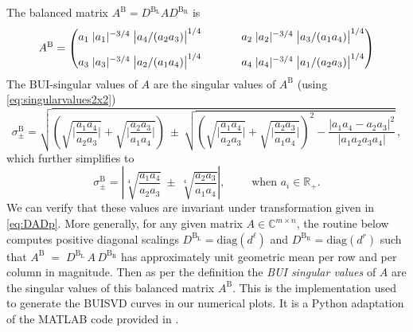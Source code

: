 \documentclass[11pt,a4paper]{article}
\newcommand{\be}{\begin{equation}}
\newcommand{\ee}{\end{equation}}
\begin{document}
The balanced matrix $A^\mathrm{B}=D^{\mathrm{B_L}} A D^{\mathrm{B_R}}$ is
\begin{equation}
\begingroup
\setlength{\arraycolsep}{1.8em}
A^{\mathrm B}=
\begin{pmatrix}
a_1\;|a_1|^{-3/4}\;\bigl|a_4/(a_2 a_3)\bigr|^{1/4}
&
a_2\;|a_2|^{-3/4}\;\bigl|a_3/(a_1 a_4)\bigr|^{1/4}
\\[8pt]
a_3\;|a_3|^{-3/4}\;\bigl|a_2/(a_1 a_4)\bigr|^{1/4}
&
a_4\;|a_4|^{-3/4}\;\bigl|a_1/(a_2 a_3)\bigr|^{1/4}
\end{pmatrix}
\endgroup
\end{equation}
The BUI-singular values of $A$ are the singular values of $A^\mathrm{B}$ (using \cref{eq:singularvalues2x2})
\begin{equation}\label{eq:ui-2x2-balanced-sv}
\sigma^{\mathrm B}_{\pm}
=
\sqrt{
\left(
\sqrt{\bigg|\frac{a_1 a_4}{a_2 a_3}\bigg|}
+
\sqrt{\bigg|\frac{a_2 a_3}{a_1 a_4}\bigg|}
\right)
\ \pm\
\sqrt{
\left(
\sqrt{\bigg|\frac{a_1 a_4}{a_2 a_3}\bigg|}
+
\sqrt{\bigg|\frac{a_2 a_3}{a_1 a_4}\bigg|}
\right)^{\!2}
-
\frac{\big|a_1 a_4 - a_2 a_3\big|^{2}}{\big|a_1 a_2 a_3 a_4\big|}
}
}\,,
\end{equation}
which further simplifies to
\be
\sigma^{\mathrm B}_{\pm}
=
\left|
\sqrt[4]{\frac{a_1 a_4}{a_2 a_3}}
\ \pm\
\sqrt[4]{\frac{a_2 a_3}{a_1 a_4}}
\right|,
\qquad \text{ when } a_i\in\mathbb{R}_{+}.
\ee
We can verify that these values are invariant under transformation given in \cref{eq:DADp}. More generally, for any given matrix $A\in\mathbb{C}^{m\times n}$, the routine below computes positive diagonal scalings $D^{\mathrm{B_L}}=\mathrm{diag}(d^\ell)$ and $D^{\mathrm{B_R}}=\mathrm{diag}(d^r)$ such that \(A^{\mathrm B} \;=\; D^{\mathrm {B_L}}\,A\,D^{\mathrm {B_R}}\) has approximately unit geometric mean per row and per column in magnitude. Then as per the definition the \emph{BUI singular values} of $A$ are the singular values of this balanced matrix $A^{\mathrm B}$. This is the implementation used to generate the BUISVD curves in our numerical plots. It is a Python adaptation of the MATLAB code provided in \cite[Appendix C]{uhlmann-main2}.
\end{document}
